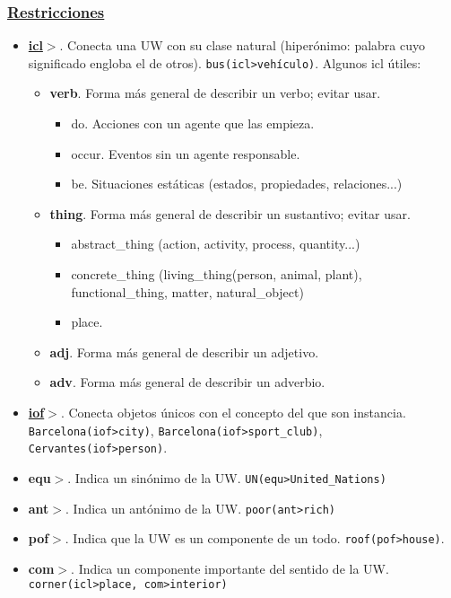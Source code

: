 \documentclass{article}
\begin{document}
\begin{multicols*}{3}
\subsubsection*{\underline{Restricciones}}

\begin{itemize}[itemsep=0pt, parsep=0pt, leftmargin=1em]
    \item \underline{\textbf{icl$>$}}. Conecta una UW con su clase natural (hiperónimo: palabra cuyo significado engloba el de otros). \verb+bus(icl>vehículo)+. Algunos icl útiles:
    \begin{itemize}[itemsep=0pt, parsep=0pt, leftmargin=1em]
        \item \textbf{verb}. Forma más general de describir un verbo; evitar usar.
        \begin{itemize}[itemsep=0pt, parsep=0pt, leftmargin=1em]
            \item do. Acciones con un agente que las empieza.
            \item occur. Eventos sin un agente responsable.
            \item be. Situaciones estáticas (estados, propiedades, relaciones...)
        \end{itemize}
        \item \textbf{thing}. Forma más general de describir un sustantivo; evitar usar.
        \begin{itemize}[itemsep=0pt, parsep=0pt, leftmargin=1em]
            \item abstract\_thing (action, activity, process, quantity...)
            \item concrete\_thing (living\_thing(person, animal, plant), functional\_thing, matter, natural\_object)
            \item place.
        \end{itemize}
        \item \textbf{adj}. Forma más general de describir un adjetivo.
        \item \textbf{adv}. Forma más general de describir un adverbio.
    \end{itemize}
    \item \underline{\textbf{iof$>$}}. Conecta objetos únicos con el concepto del que son instancia. \verb+Barcelona(iof>city)+, \verb+Barcelona(iof>sport_club)+, \verb+Cervantes(iof>person)+.
    \item \textbf{equ$>$}. Indica un sinónimo de la UW. \verb+UN(equ>United_Nations)+
    \item \textbf{ant$>$}. Indica un antónimo de la UW. \verb+poor(ant>rich)+
    \item \textbf{pof$>$}. Indica que la UW es un componente de un todo. \verb+roof(pof>house)+.
    \item \textbf{com$>$}. Indica un componente importante del sentido de la UW. \verb+corner(icl>place, com>interior)+
\end{itemize}


\end{multicols*}
\end{document}
